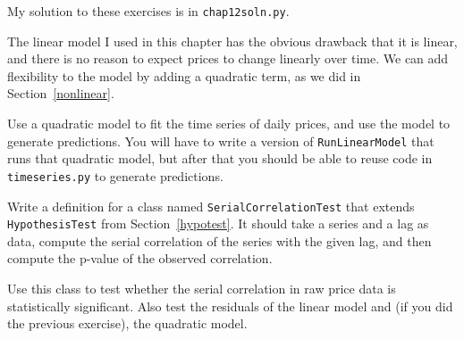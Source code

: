 My solution to these exercises is in \verb"chap12soln.py".

\begin{exercise}
The linear model I used in this chapter has the obvious drawback
that it is linear, and there is no reason to expect prices to
change linearly over time.
We can add flexibility to the model by adding a quadratic term,
as we did in Section~\ref{nonlinear}.  

Use a quadratic model to fit the time series of daily prices,
and use the model to generate predictions.  You will have to
write a version of {\tt RunLinearModel} that runs that quadratic
model, but after that you should be able to reuse code in
{\tt timeseries.py} to generate predictions.

\end{exercise}

\begin{exercise}
Write a definition for a class named {\tt SerialCorrelationTest}
that extends {\tt HypothesisTest} from Section~\ref{hypotest}.
It should take a series and a lag as data, compute the serial
correlation of the series with the given lag, and then compute
the p-value of the observed correlation.

Use this class to test whether the serial correlation in raw
price data is statistically significant.  Also test the residuals
of the linear model and (if you did the previous exercise),
the quadratic model.
   

\end{exercise}

